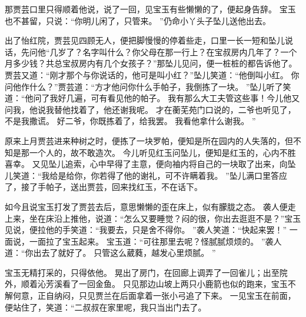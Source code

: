 那贾芸口里只得顺着他说，说了一回，见宝玉有些懒懒的了，便起身告辞。
宝玉也不甚留，只说：“你明儿闲了，只管来。
”仍命小丫头子坠儿送他出去。
\par
出了怡红院，贾芸见四顾无人，便把脚慢慢的停着些走，口里一长一短和坠儿说话，先问他“几岁了？名字叫什么？你父母在那一行上？在宝叔房内几年了？一个月多少钱？共总宝叔房内有几个女孩子？”那坠儿见问，便一桩桩的都告诉他了。
贾芸又道：“刚才那个与你说话的，他可是叫小红？”坠儿笑道：“他倒叫小红。
你问他作什么？”贾芸道：“方才他问你什么手帕子，我倒拣了一块。
”坠儿听了笑道：“他问了我好几遍，可有看见他的帕子。
我有那么大工夫管这些事！今儿他又问我，他说我替他找着了，他还谢我呢。
才在蘅芜苑门口说的，二爷也听见了，不是我撒谎。
好二爷，你既拣着了，给我罢。
我看他拿什么谢我。
”\par
原来上月贾芸进来种树之时，便拣了一块罗帕，便知是所在园内的人失落的，但不知是那一个人的，故不敢造次。
今儿听见红玉问坠儿，便知是红玉的，心内不胜喜幸。
又见坠儿追索，心中早得了主意，便向袖内将自己的一块取了出来，向坠儿笑道：“我给是给你，你若得了他的谢礼，可不许瞒着我。
”坠儿满口里答应了，接了手帕子，送出贾芸，回来找红玉，不在话下。
\par
如今且说宝玉打发了贾芸去后，意思懒懒的歪在床上，似有朦胧之态。
袭人便走上来，坐在床沿上推他，说道：“怎么又要睡觉？闷的很，你出去逛逛不是？”宝玉见说，便拉他的手笑道：“我要去，只是舍不得你。
”袭人笑道：“快起来罢！”
一面说，一面拉了宝玉起来。
宝玉道：“可往那里去呢？怪腻腻烦烦的。
”袭人道：“你出去了就好了。
只管这么葳蕤，越发心里烦腻。
”\par
宝玉无精打采的，只得依他。
晃出了房门，在回廊上调弄了一回雀儿；出至院外，顺着沁芳溪看了一回金鱼。
只见那边山坡上两只小鹿箭也似的跑来，宝玉不解何意，正自纳闷，只见贾兰在后面拿着一张小弓追了下来。
一见宝玉在前面，便站住了，笑道：“二叔叔在家里呢，我只当出门去了。

